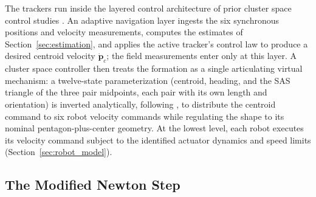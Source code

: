 \documentclass[lettersize,journal]{IEEEtran}
\begin{document}
The trackers run inside the layered control architecture of prior
cluster space control studies \cite{14,30}. An adaptive navigation
layer ingests the six synchronous positions and velocity measurements,
computes the estimates of Section~\ref{sec:estimation}, and applies
the active tracker's control law to produce a desired centroid velocity
$\dot{\mathbf{p}}_c$; the field measurements enter
only at this layer. A cluster space controller then treats the
formation as a single articulating virtual mechanism: a twelve-state
parameterization (centroid, heading, and the SAS triangle of the three
pair midpoints, each pair with its own length and orientation) is
inverted analytically, following \cite{14,30}, to distribute the
centroid command to six robot velocity commands while regulating the
shape to its nominal pentagon-plus-center geometry. At the lowest
level, each robot executes its velocity command subject to the
identified actuator dynamics and speed limits
(Section~\ref{sec:robot_model}).

\subsection{The Modified Newton Step}
\label{sec:mod_newton}
\end{document}
